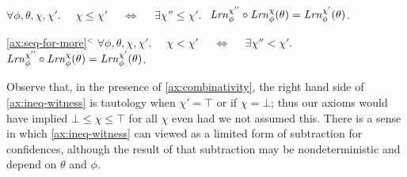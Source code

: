 \begin{LrnAxioms}
 	\item
 	$\forall \phi, \theta,\chi,\chi'.\quad$
 	$\chi \le \chi'$ 
         $\quad\iff\quad$
         $\exists \chi'' \le \chi'.~~$
 		$\mathit{Lrn}_\phi^{\chi''} \circ \mathit{Lrn}_\phi^\chi (\theta) = \mathit{Lrn}_\phi^{\chi'}(\theta)$.
         \label{ax:ineq-witness}
 		\label{ax:seq-for-more}
 	\item[\cref*{ax:seq-for-more}$^{<}$]
 	$\forall \phi, \theta,\chi,\chi'.\quad$
 	$\chi < \chi'$ 
         $\quad\iff\quad$
         $\exists \chi'' < \chi'.~~$
 		$\mathit{Lrn}_\phi^{\chi''} \circ \mathit{Lrn}_\phi^\chi (\theta) = \mathit{Lrn}_\phi^{\chi'}(\theta)$.
        \label{ax:ineq-witness-strict}
 		\label{ax:seq-for-more-strict}
 \end{LrnAxioms}
 Observe that, in the presence of \cref{ax:combinativity}, the right hand side of \cref{ax:ineq-witness} is tautology when $\chi' = \top$ or if $\chi = \bot$; thus our axioms would have implied $\bot \le \chi \le \top$ for all $\chi$ even had we not assumed this. 
 There is a sense in which \cref{ax:ineq-witness} can viewed as a limited form of subtraction for confidences, although the result of that subtraction may be nondeterministic and depend on $\theta$ and $\phi$. 
 
